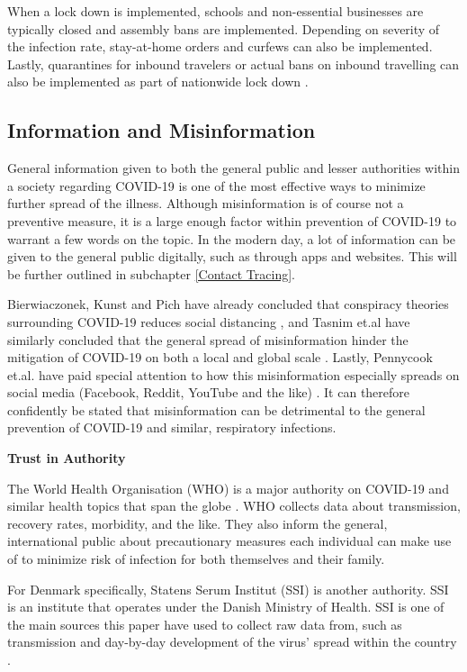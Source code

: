 When a lock down is implemented, schools and non-essential businesses are typically closed and assembly bans are implemented. Depending on severity of the infection rate, stay-at-home orders and curfews can also be implemented. Lastly, quarantines for inbound travelers or actual bans on inbound travelling can also be implemented as part of nationwide lock down \citep{gostin_governmental_2020}.

\subsection{Information and Misinformation}

General information given to both the general public and lesser authorities within a society regarding COVID-19 is one of the most effective ways to minimize further spread of the illness. Although misinformation is of course not a preventive measure, it is a large enough factor within prevention of COVID-19 to warrant a few words on the topic. In the modern day, a lot of information can be given to the general public digitally, such as through apps and websites. This will be further outlined in subchapter \ref{Contact Tracing}.

Bierwiaczonek, Kunst and Pich have already concluded that conspiracy theories surrounding COVID-19 reduces social distancing \citep{bierwiaczonek_belief_nodate}, and Tasnim et.al have similarly concluded that the general spread of misinformation hinder the mitigation of COVID-19 on both a local and global scale \citep{tasnim_impact_2020}. Lastly, Pennycook et.al. have paid special attention to how this misinformation especially spreads on social media (Facebook, Reddit, YouTube and the like) \citep{pennycook_fighting_2020}. It can therefore confidently be stated that misinformation can be detrimental to the general prevention of COVID-19 and similar, respiratory infections.

\textbf{Trust in Authority}

The World Health Organisation (WHO) is a major authority on COVID-19 and similar health topics that span the globe \citep{who_home_nodate}. WHO collects data about transmission, recovery rates, morbidity, and the like. They also inform the general, international public about precautionary measures each individual can make use of to minimize risk of infection for both themselves and their family. 

For Denmark specifically, Statens Serum Institut (SSI) is another authority. SSI is an institute that operates under the Danish Ministry of Health. SSI is one of the main sources this paper have used to collect raw data from, such as transmission and day-by-day development of the virus’ spread within the country \citep{ssi_statens_nodate}.
